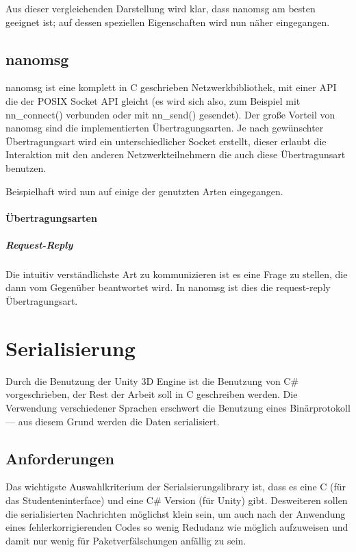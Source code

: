 Aus dieser vergleichenden Darstellung wird klar, dass nanomsg am besten geeignet ist; auf dessen speziellen Eigenschaften wird nun n{\"{a}}her eingegangen.

\subsection{nanomsg}
nanomsg ist eine komplett in C geschrieben Netzwerkbibliothek, mit einer API die der POSIX Socket API gleicht (es wird sich also, zum Beispiel mit nn\_connect() verbunden oder mit nn\_send() gesendet).
Der gro{\ss}e Vorteil von nanomsg sind die implementierten {\"{U}}bertragungsarten. Je nach gew{\"{u}}nschter {\"{U}}bertragungsart wird ein unterschiedlicher Socket erstellt, dieser erlaubt die
Interaktion mit den anderen Netzwerkteilnehmern die auch diese {\"{U}}bertragunsart benutzen.

Beispielhaft wird nun auf einige der genutzten Arten eingegangen.

\paragraph{{\"{U}}bertragungsarten}
\subparagraph{Request-Reply} Die intuitiv verst{\"{a}}ndlichste Art zu kommunizieren ist es eine Frage zu stellen, die dann vom Gegen{\"{u}}ber beantwortet wird. In nanomsg ist dies die request-reply
{\"{U}}bertragungsart.

\clearpage
\section{Serialisierung}
Durch die Benutzung der Unity 3D Engine ist die Benutzung von C\# vorgeschrieben, der Rest der Arbeit soll in C geschreiben werden. Die Verwendung verschiedener Sprachen erschwert die Benutzung eines
Bin{\"{a}}rprotokoll --- aus diesem Grund werden die Daten serialisiert.

\subsection{Anforderungen}
Das wichtigste Auswahlkriterium der Serialsierungslibrary ist, dass es eine C (f{\"{u}}r das Studenteninterface) und eine C\# Version (f{\"{u}}r Unity) gibt.
Desweiteren sollen die serialisierten Nachrichten m{\"{o}}glichst klein sein, um auch nach der Anwendung
eines fehlerkorrigierenden Codes so wenig Redudanz wie m{\"{o}}glich aufzuweisen und damit nur wenig f{\"{u}}r Paketverf{\"{a}}lschungen anf{\"{a}}llig zu sein.

